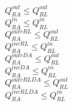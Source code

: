 $Q^{out}_{RA} \leq Q^{out}_{RL} $\\
$Q^{in}_{RA} \leq Q^{in}_{RL} $\\
$Q^{outrRL}_{RA} \leq Q^{out}_{RL} $\\
$Q^{inrRL}_{RA} \leq Q^{in}_{RL} $\\
$Q^{outrDA}_{RA} \leq Q^{out}_{RL} $\\
$Q^{inrDA}_{RA} \leq Q^{in}_{RL} $\\
$Q^{outrRLDA}_{RA} \leq Q^{out}_{RL} $\\
$Q^{inrRLDA}_{RA} \leq Q^{in}_{RL} $\\